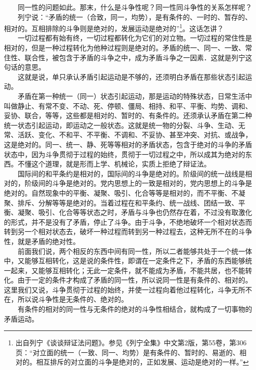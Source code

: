 \documentclass[cn,11pt,chinese]{elegantbook}
\begin{document}
　　同一性的问题如此。那末，什么是斗争性呢？同一性同斗争性的关系怎样呢？\\
　　列宁说：“矛盾的统一（合致，同一，均势），是有条件的、一时的、暂存的、相对的。互相排除的斗争则是绝对的，发展运动是绝对的”\footnote[13]{ 出自列宁《谈谈辩证法问题》。参见《列宁全集》中文第2版，第55卷，第306页：“对立面的统一（一致、同一、均势）是有条件的、暂时的、易逝的、相对的。相互排斥的对立面的斗争是绝对的，正如发展、运动是绝对的一样。”}。这话怎讲？\\
　　一切过程都有始有终，一切过程都转化为它们的对立物。一切过程的常住性是相对的，但是一种过程转化为他种过程则是绝对的。矛盾的统一、同一、一致、常住性、联合性，被包含于矛盾的斗争之中，成为矛盾斗争之一因素．这就是列宁这句话的意思。\\
　　这就是说，单只承认矛盾引起运动是不够的，还须明白矛盾在那些状态引起运动。\\
　　矛盾在第一种统一（同一）状态引起运动，那是运动的特殊状态，日常生活中叫做静止、有常不变、不动、死、停顿、僵局、相持、和平、平衡、均势、调和、妥协、联合，等等，这些都是相对的、暂时的、有条件的。还须承认矛盾在第二种统一状态引起运动，即运动之一般状态。这就是统一物的分裂、斗争、生动、无常、活跃、变化、不和平、不平衡、不调和、不妥协、甚至冲突、对抗、或战争，这是绝对的。同一、统一、静、死等等相对的矛盾状态，包含于绝对的斗争的矛盾状态中，因为斗争贯彻于过程的始终，贯彻于一切过程之中，所以成其为绝对的东西。不懂这个道理，就是形而上学、机械论，实质上拒绝了辩证法。\\
　　国际间的和平条约是相对的，国际间的斗争是绝对的。阶级间的统一战线是相对的，阶级间的斗争是绝对的。党内思想上的一致是相对的，党内思想上的斗争是绝对的。自然现象中的平衡、凝聚、吸引、化合等等是相对的，而不平衡、不凝聚、排斥、分解等等是绝对的。当着过程在和平条约、统一战线、团结一致、平衡、凝聚、吸引、化合等等状态之时，矛盾与斗争也仍然存在着，不过没有取激化的形式，并不是没有了矛盾，停止了斗争。由于斗争，不绝地破坏一个相对状态而转到另一个相对状态去，破坏一种过程而转到另一种过程去，这种无所不在的斗争性，就是矛盾的绝对性。\\
　　前面我们说，两个相反的东西中间有同一性，所以二者能够共处于一个统一体中，又能够互相转化，这是说的条件性，即谓在一定条件之下，矛盾的东西能够统一起来，又能够互相转化；无此一定条件，就不能成为矛盾，不能共居，也不能转化。由于一定的条件才构成了矛盾的同一性，所以说同一性是有条件的、相对的。这里我们又说，斗争贯彻于过程的始终，并使一过程向着他过程转化，斗争无所不在，所以说斗争性是无条件的、绝对的。\\
　　有条件的相对的同一性与无条件的绝对的斗争性相结合，就构成了一切事物的矛盾运动。\\
\end{document}
